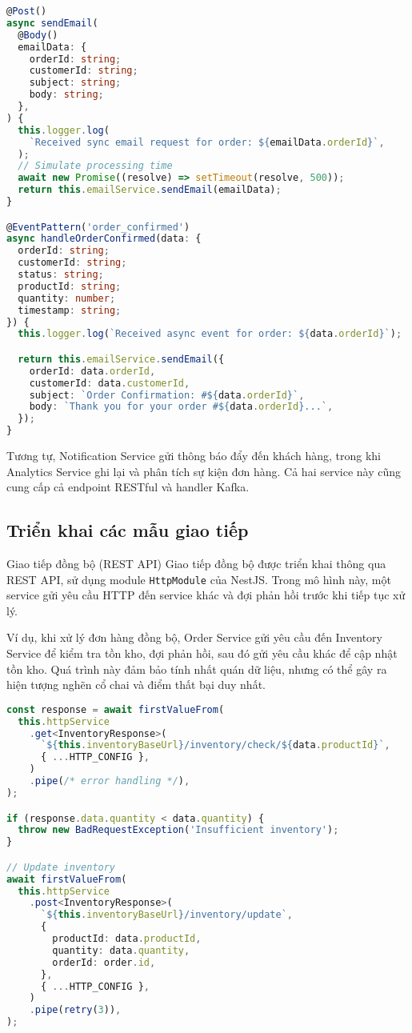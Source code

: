 \begin{lstlisting}[language=Typescript]
@Post()
async sendEmail(
  @Body()
  emailData: {
    orderId: string;
    customerId: string;
    subject: string;
    body: string;
  },
) {
  this.logger.log(
    `Received sync email request for order: ${emailData.orderId}`,
  );
  // Simulate processing time
  await new Promise((resolve) => setTimeout(resolve, 500));
  return this.emailService.sendEmail(emailData);
}

@EventPattern('order_confirmed')
async handleOrderConfirmed(data: {
  orderId: string;
  customerId: string;
  status: string;
  productId: string;
  quantity: number;
  timestamp: string;
}) {
  this.logger.log(`Received async event for order: ${data.orderId}`);

  return this.emailService.sendEmail({
    orderId: data.orderId,
    customerId: data.customerId,
    subject: `Order Confirmation: #${data.orderId}`,
    body: `Thank you for your order #${data.orderId}...`,
  });
}
\end{lstlisting}

Tương tự, Notification Service gửi thông báo đẩy đến khách hàng, trong khi Analytics Service ghi lại và phân tích sự kiện đơn hàng. Cả hai service này cũng cung cấp cả endpoint RESTful và handler Kafka.

\subsection{Triển khai các mẫu giao tiếp}

Giao tiếp đồng bộ (REST API)
Giao tiếp đồng bộ được triển khai thông qua REST API, sử dụng module \texttt{HttpModule} của NestJS. Trong mô hình này, một service gửi yêu cầu HTTP đến service khác và đợi phản hồi trước khi tiếp tục xử lý.

Ví dụ, khi xử lý đơn hàng đồng bộ, Order Service gửi yêu cầu đến Inventory Service để kiểm tra tồn kho, đợi phản hồi, sau đó gửi yêu cầu khác để cập nhật tồn kho. Quá trình này đảm bảo tính nhất quán dữ liệu, nhưng có thể gây ra hiện tượng nghẽn cổ chai và điểm thất bại duy nhất.

\begin{lstlisting}[language=Typescript]
const response = await firstValueFrom(
  this.httpService
    .get<InventoryResponse>(
      `${this.inventoryBaseUrl}/inventory/check/${data.productId}`,
      { ...HTTP_CONFIG },
    )
    .pipe(/* error handling */),
);

if (response.data.quantity < data.quantity) {
  throw new BadRequestException('Insufficient inventory');
}

// Update inventory
await firstValueFrom(
  this.httpService
    .post<InventoryResponse>(
      `${this.inventoryBaseUrl}/inventory/update`,
      {
        productId: data.productId,
        quantity: data.quantity,
        orderId: order.id,
      },
      { ...HTTP_CONFIG },
    )
    .pipe(retry(3)),
);
\end{lstlisting}

